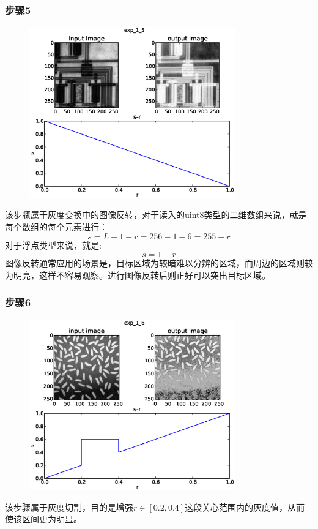 \documentclass[]{IEEEphot}
\begin{document}
\subsubsection{步骤5}
\begin{figure}[h]
\centering
\includegraphics[width=21pc]{exp_1_5.eps}\\
\label{fig_env2}
\end{figure}
该步骤属于灰度变换中的图像反转，对于读入的uint8类型的二维数组来说，就是每个数组的每个元素进行：
$$ s=L-1-r=256-1-6=255-r$$
对于浮点类型来说，就是:
$$s=1-r$$
图像反转通常应用的场景是，目标区域为较暗难以分辨的区域，而周边的区域则较为明亮，这样不容易观察。进行图像反转后则正好可以突出目标区域。
\subsubsection{步骤6}
\begin{figure}[h]
\centering
\includegraphics[width=21pc]{exp_1_6.eps}\\
\label{fig_env2}
\end{figure}
该步骤属于灰度切割，目的是增强$r\in[0.2,0.4]$这段关心范围内的灰度值，从而使该区间更为明显。
\end{document}
